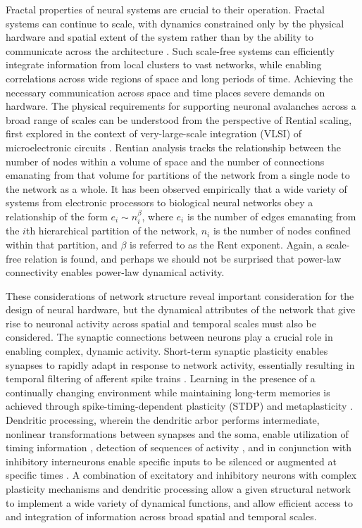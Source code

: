 \documentclass[twocolumn]{article}
\begin{document}
Fractal properties of neural systems are crucial to their operation. Fractal systems can continue to scale, with dynamics constrained only by the physical hardware and spatial extent of the system rather than by the ability to communicate across the architecture \cite{plth2007}. Such scale-free systems can efficiently integrate information from local clusters to vast networks, while enabling correlations across wide regions of space and long periods of time. Achieving the necessary communication across space and time places severe demands on hardware. The physical requirements for supporting neuronal avalanches across a broad range of scales can be understood from the perspective of Rential scaling, first explored in the context of very-large-scale integration (VLSI) of microelectronic circuits \cite{}. Rentian analysis tracks the relationship between the number of nodes within a volume of space and the number of connections emanating from that volume for partitions of the network from a single node to the network as a whole. It has been observed empirically that a wide variety of systems from electronic processors to biological neural networks obey a relationship of the form $e_i\sim n_i^{\beta}$, where $e_i$ is the number of edges emanating from the $i$th hierarchical partition of the network, $n_i$ is the number of nodes confined within that partition, and $\beta$ is referred to as the Rent exponent. Again, a scale-free relation is found, and perhaps we should not be surprised that power-law connectivity enables power-law dynamical activity.

These considerations of network structure reveal important consideration for the design of neural hardware, but the dynamical attributes of the network that give rise to neuronal activity across spatial and temporal scales must also be considered. The synaptic connections between neurons play a crucial role in enabling complex, dynamic activity. Short-term synaptic plasticity enables synapses to rapidly adapt in response to network activity, essentially resulting in temporal filtering of afferent spike trains \cite{abre2004}. Learning in the presence of a continually changing environment while maintaining long-term memories is achieved through spike-timing-dependent plasticity (STDP) \cite{} and metaplasticity \cite{}. Dendritic processing, wherein the dendritic arbor performs intermediate, nonlinear transformations between synapses and the soma, enable utilization of timing information \cite{}, detection of sequences of activity \cite{haah2015}, and in conjunction with inhibitory interneurons enable specific inputs to be silenced or augmented at specific times \cite{bu2006}. A combination of excitatory and inhibitory neurons with complex plasticity mechanisms and dendritic processing allow a given structural network to implement a wide variety of dynamical functions, and allow efficient access to and integration of information across broad spatial and temporal scales. 
\end{document}
